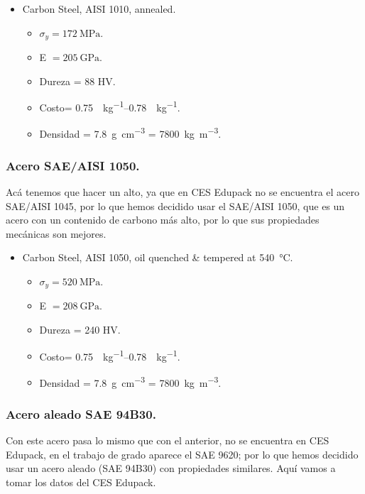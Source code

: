 \documentclass[15pt,a4paper]{article}
\begin{document}
\begin{itemize}
    \item Carbon Steel, AISI 1010, annealed.
    \begin{itemize}
        \item $\sigma_{y} = \SI{172}{\mega\pascal}$.
        \item E $= \SI{205}{\giga\pascal}$.
        \item Dureza = 88 HV.
        \item Costo= \SIrange[range-phrase={ - }, range-units=single]{0,75}{0,78}{\per\kilogram}.
        \item Densidad = \SI{7,8}{\gram\per\centi\metre\cubed} = \SI{7800}{\kilogram\per\cubic\metre}.
    \end{itemize}
\end{itemize}

\subsubsection{Acero SAE/AISI 1050.}

Acá tenemos que hacer un alto, ya que en CES Edupack no se encuentra el acero SAE/AISI 1045, por lo que hemos decidido usar el SAE/AISI 1050, que es un acero con un contenido de carbono más alto, por lo que sus propiedades mecánicas son mejores.

\begin{itemize}
    \item Carbon Steel, AISI 1050, oil quenched \& tempered at \SI{540}{\celsius}.
    \begin{itemize}
        \item $\sigma_{y} = \SI{520}{\mega\pascal}$.
        \item E $= \SI{208}{\giga\pascal}$.
        \item Dureza = 240 HV.
        \item Costo= \SIrange[range-phrase={ - }, range-units=single]{0,75}{0,78}{\per\kilogram}.
        \item Densidad = \SI{7,8}{\gram\per\centi\metre\cubed} = \SI{7800}{\kilogram\per\cubic\metre}.
    \end{itemize}
\end{itemize}

\subsubsection{Acero aleado SAE 94B30.}

Con este acero pasa lo mismo que con el anterior, no se encuentra en CES Edupack, en el trabajo de grado aparece el SAE 9620; por lo que hemos decidido usar un acero aleado (SAE 94B30) con propiedades similares. Aquí vamos a tomar los datos del CES Edupack.
\end{document}
